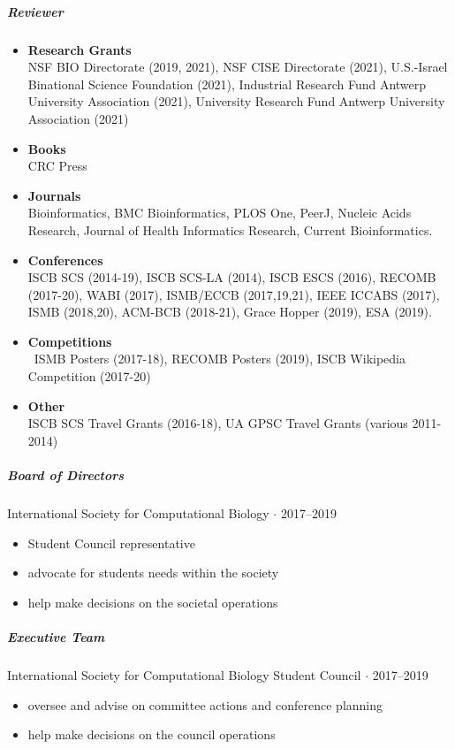 \documentclass[10pt,letterpaper]{article}
\newcommand{\bigdot}{$\cdot$\xspace}
\begin{document}
\subparagraph{Reviewer} 
\begin{itemize}[leftmargin=!,labelindent=5pt,itemindent=-15pt]
    \item \textbf{Research Grants} \\ 
    	NSF BIO Directorate (2019, 2021), 
    	NSF CISE Directorate (2021), 
	U.S.-Israel Binational Science Foundation (2021), 
	Industrial Research Fund Antwerp University Association (2021), 
	University Research Fund Antwerp University Association (2021)
    \item \textbf{Books} \\
    	CRC Press
    \item \textbf{Journals} \\
        Bioinformatics,
        BMC Bioinformatics, 
        PLOS One, 
        PeerJ, 
        Nucleic Acids Research, 
        Journal of Health Informatics Research,
        Current Bioinformatics.
    \item \textbf{Conferences} \\
        ISCB SCS (2014-19), %
        ISCB SCS-LA (2014), %
        ISCB ESCS (2016), %
	RECOMB (2017-20), %
	WABI (2017), %
	ISMB/ECCB (2017,19,21), %
    	IEEE ICCABS (2017), %
	ISMB (2018,20), %
	ACM-BCB (2018-21), %
	Grace Hopper (2019), %
	ESA (2019). %
     \item \textbf{Competitions} \\\
     	ISMB Posters (2017-18),
	RECOMB Posters (2019), 
     	ISCB Wikipedia Competition (2017-20)
     \item \textbf{Other} \\
         ISCB SCS Travel Grants (2016-18), 
         UA GPSC Travel Grants (various 2011-2014)
\end{itemize}

\subparagraph{Board of Directors}
International Society for Computational Biology  \bigdot 2017--2019
\begin{itemize}
    \item Student Council representative 
    \item advocate for students needs within the society
    \item help make decisions on the societal operations
\end{itemize}

\subparagraph{Executive Team}
International Society for Computational Biology Student Council \bigdot 2017--2019
\begin{itemize} 
    \item oversee and advise on committee actions and conference planning 
    \item help make decisions on the council operations
\end{itemize}
\end{document}
